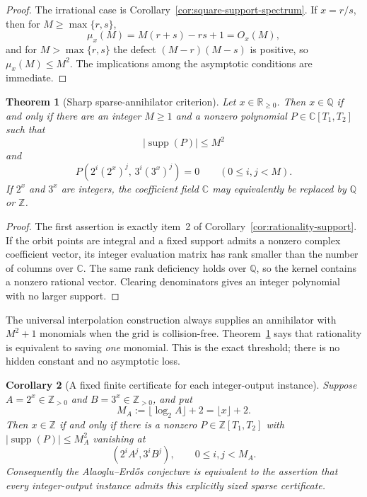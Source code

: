 \documentclass[11pt,oneside]{article}
\newtheorem{theorem}{Theorem}[section]
\newtheorem{corollary}[theorem]{Corollary}
\theoremstyle{definition}
\theoremstyle{remark}
\newcommand{\Z}{\mathbb Z}
\newcommand{\Q}{\mathbb Q}
\newcommand{\R}{\mathbb R}
\newcommand{\C}{\mathbb C}
\newcommand{\supp}{\operatorname{supp}}
\begin{document}
\begin{proof}
The irrational case is Corollary~\ref{cor:square-support-spectrum}.  If $x=r/s$, then for
$M\ge\max\{r,s\}$,
\[
  \mu_x(M)=M(r+s)-rs+1=O_x(M),
\]
and for $M>\max\{r,s\}$ the defect $(M-r)(M-s)$ is positive, so
$\mu_x(M)\le M^2$.  The implications among the asymptotic conditions are immediate.
\end{proof}

\begin{theorem}[Sharp sparse-annihilator criterion]
\label{thm:sharp-sparse-criterion}
Let $x\in\R_{\ge0}$.  Then $x\in\Q$ if and only if there are an integer $M\ge1$ and a
nonzero polynomial $P\in\C[T_1,T_2]$ such that
\[
  |\supp(P)|\le M^2
\]
and
\[
  P(2^i(2^x)^j,\,3^i(3^x)^j)=0
  \qquad(0\le i,j<M).
\]
If $2^x$ and $3^x$ are integers, the coefficient field $\C$ may equivalently be replaced by
$\Q$ or $\Z$.
\end{theorem}

\begin{proof}
The first assertion is exactly item~2 of Corollary~\ref{cor:rationality-support}.  If the
orbit points are integral and a fixed support admits a nonzero complex coefficient vector,
its integer evaluation matrix has rank smaller than the number of columns over $\C$.  The
same rank deficiency holds over $\Q$, so the kernel contains a nonzero rational vector.
Clearing denominators gives an integer polynomial with no larger support.
\end{proof}

The universal interpolation construction always supplies an annihilator with $M^2+1$
monomials when the grid is collision-free.  Theorem~\ref{thm:sharp-sparse-criterion} says that
rationality is equivalent to saving \emph{one} monomial.  This is the exact threshold; there
is no hidden constant and no asymptotic loss.

\begin{corollary}[A fixed finite certificate for each integer-output instance]
\label{cor:fixed-M-certificate}
Suppose $A=2^x\in\Z_{>0}$ and $B=3^x\in\Z_{>0}$, and put
\[
  M_A:=\lfloor\log_2A\rfloor+2=\lfloor x\rfloor+2.
\]
Then $x\in\Z$ if and only if there is a nonzero $P\in\Z[T_1,T_2]$ with
$|\supp(P)|\le M_A^2$ vanishing at
\[
  (2^iA^j,3^iB^j),\qquad 0\le i,j<M_A.
\]
Consequently the Alaoglu--Erd\H{o}s conjecture is equivalent to the assertion that every
integer-output instance admits this explicitly sized sparse certificate.
\end{corollary}
\end{document}
